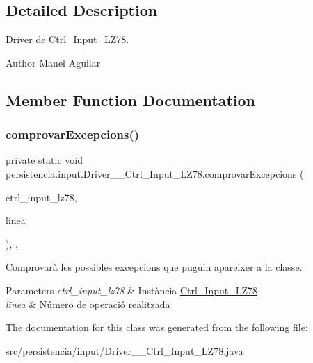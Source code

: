 \subsection{Detailed Description}
Driver de \hyperlink{classpersistencia_1_1input_1_1Ctrl__Input__LZ78}{Ctrl\+\_\+\+Input\+\_\+\+L\+Z78}. 

\begin{DoxyAuthor}{Author}
Manel Aguilar 
\end{DoxyAuthor}


\subsection{Member Function Documentation}
\mbox{\label{classpersistencia_1_1input_1_1Driver____Ctrl__Input__LZ78_a285493e74dff1f6b2520f010f75b850c}} 
\subsubsection{\texorpdfstring{comprovar\+Excepcions()}{comprovarExcepcions()}}
{\footnotesize\ttfamily private static void persistencia.\+input.\+Driver\+\_\+\+\_\+\+Ctrl\+\_\+\+Input\+\_\+\+L\+Z78.\+comprovar\+Excepcions (\begin{DoxyParamCaption}\item[{\hyperlink{classpersistencia_1_1input_1_1Ctrl__Input__LZ78}{Ctrl\+\_\+\+Input\+\_\+\+L\+Z78}}]{ctrl\+\_\+input\+\_\+lz78,  }\item[{String}]{linea }\end{DoxyParamCaption})\hspace{0.3cm}{\ttfamily [inline]}, {\ttfamily [static]}, {\ttfamily [private]}}



Comprovarà les possibles excepcions que puguin apareixer a la classe. 


\begin{DoxyParams}{Parameters}
{\em ctrl\+\_\+input\+\_\+lz78} & Instància \hyperlink{classpersistencia_1_1input_1_1Ctrl__Input__LZ78}{Ctrl\+\_\+\+Input\+\_\+\+L\+Z78} \\
\hline
{\em linea} & Número de operació realitzada \\
\hline
\end{DoxyParams}


The documentation for this class was generated from the following file\+:\begin{DoxyCompactItemize}
\item 
src/persistencia/input/Driver\+\_\+\+\_\+\+Ctrl\+\_\+\+Input\+\_\+\+L\+Z78.\+java\end{DoxyCompactItemize}
